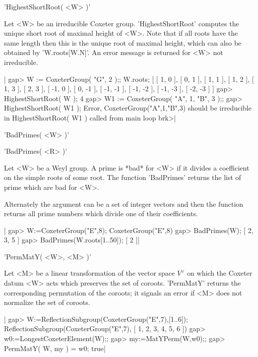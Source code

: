 
'HighestShortRoot( <W> )'

Let <W> be an irreducible Coxeter  group. 'HighestShortRoot' computes the
unique short root of maximal height of <W>.  Note that  if all roots have
the same length then this is the unique root of maximal height, which can
also be obtained by 'W.roots[W.N]'.  An error message is returned for <W>
not irreducible.

|    gap> W := CoxeterGroup( "G", 2 );;  W.roots;
    [ [ 1, 0 ], [ 0, 1 ], [ 1, 1 ], [ 1, 2 ], [ 1, 3 ], [ 2, 3 ],
      [ -1, 0 ], [ 0, -1 ], [ -1, -1 ], [ -1, -2 ], [ -1, -3 ],
      [ -2, -3 ] ]
    gap> HighestShortRoot( W );
    4
    gap> W1 := CoxeterGroup( "A", 1, "B", 3 );;
    gap> HighestShortRoot( W1 );
    Error, CoxeterGroup("A",1,"B",3) should be irreducible
     in
    HighestShortRoot( W1 ) called from
    main loop
    brk>|


'BadPrimes( <W> )'

'BadPrimes( <R> )'

Let  <W>  be  a  Weyl  group.  A  prime  is  *bad*  for <W> if it divides a
coefficient  on the  simple roots  of some  root. The  function 'BadPrimes'
returns the list of prime which are bad for <W>.

Alternately  the argument  can be  a set  of integer  vectors and  then the
function returns all prime numbers which divide one of their coefficients.

|    gap> W:=CoxeterGroup("E",8);
    CoxeterGroup("E",8)
    gap> BadPrimes(W);
    [ 2, 3, 5 ]
    gap> BadPrimes(W.roots{[1..50]});
    [ 2 ]|


'PermMatY( <W>, <M> )'

Let <M> be a linear transformation of  the vector space $V^\vee$ on which
the Coxeter    datum  <W> acts  which  preserves    the  set of  coroots.
'PermMatY'  returns  the  corresponding permutation of    the coroots; it
signals an error if <M> does not normalize the set of coroots.

|    gap>  W:=ReflectionSubgroup(CoxeterGroup("E",7),[1..6]);
    ReflectionSubgroup(CoxeterGroup("E",7), [ 1, 2, 3, 4, 5, 6 ])
    gap>  w0:=LongestCoxeterElement(W);;
    gap> my:=MatYPerm(W,w0);;
    gap> PermMatY( W, my ) = w0;
    true|

